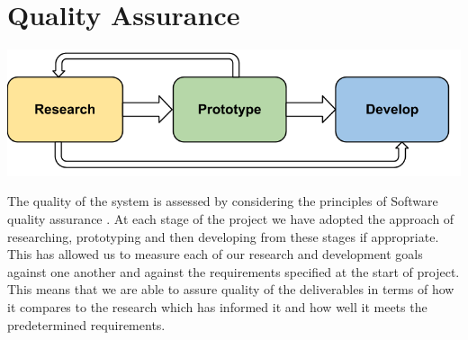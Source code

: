 \section{Quality Assurance}

\begin{center}
    \includegraphics[scale=0.3]{images/developmentparse.png}
\end{center}

The quality of the system is assessed by considering the principles of Software quality assurance \cite{Chemuturi2010}. At each stage of the project we have adopted the approach  of researching, prototyping and then developing from these stages if appropriate. This has allowed us to measure each of our research and development goals against one another and against the requirements specified at the start of project. This means that we are able to assure quality of the deliverables in terms of how it compares to the research which has informed it and how well it meets the predetermined requirements.




